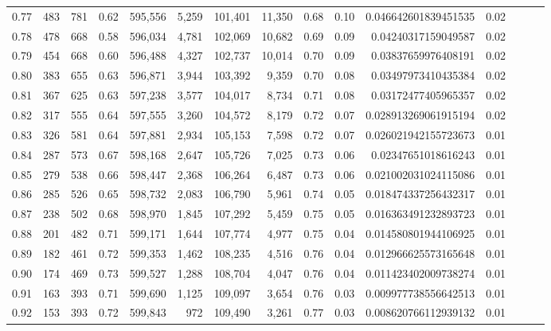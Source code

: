 \begin{tabular}{rrrrrrrrrrrrrrr}
0.77 &     483 &    781 &  0.62 &  595,556 &    5,259 &  101,401 &   11,350 &  0.68 &  0.10 &  0.046642601839451535 &      0.02 \\
0.78 &     478 &    668 &  0.58 &  596,034 &    4,781 &  102,069 &   10,682 &  0.69 &  0.09 &   0.04240317159049587 &      0.02 \\
0.79 &     454 &    668 &  0.60 &  596,488 &    4,327 &  102,737 &   10,014 &  0.70 &  0.09 &   0.03837659976408191 &      0.02 \\
0.80 &     383 &    655 &  0.63 &  596,871 &    3,944 &  103,392 &    9,359 &  0.70 &  0.08 &   0.03497973410435384 &      0.02 \\
0.81 &     367 &    625 &  0.63 &  597,238 &    3,577 &  104,017 &    8,734 &  0.71 &  0.08 &   0.03172477405965357 &      0.02 \\
0.82 &     317 &    555 &  0.64 &  597,555 &    3,260 &  104,572 &    8,179 &  0.72 &  0.07 &  0.028913269061915194 &      0.02 \\
0.83 &     326 &    581 &  0.64 &  597,881 &    2,934 &  105,153 &    7,598 &  0.72 &  0.07 &  0.026021942155723673 &      0.01 \\
0.84 &     287 &    573 &  0.67 &  598,168 &    2,647 &  105,726 &    7,025 &  0.73 &  0.06 &   0.02347651018616243 &      0.01 \\
0.85 &     279 &    538 &  0.66 &  598,447 &    2,368 &  106,264 &    6,487 &  0.73 &  0.06 &  0.021002031024115086 &      0.01 \\
0.86 &     285 &    526 &  0.65 &  598,732 &    2,083 &  106,790 &    5,961 &  0.74 &  0.05 &  0.018474337256432317 &      0.01 \\
0.87 &     238 &    502 &  0.68 &  598,970 &    1,845 &  107,292 &    5,459 &  0.75 &  0.05 &  0.016363491232893723 &      0.01 \\
0.88 &     201 &    482 &  0.71 &  599,171 &    1,644 &  107,774 &    4,977 &  0.75 &  0.04 &  0.014580801944106925 &      0.01 \\
0.89 &     182 &    461 &  0.72 &  599,353 &    1,462 &  108,235 &    4,516 &  0.76 &  0.04 &  0.012966625573165648 &      0.01 \\
0.90 &     174 &    469 &  0.73 &  599,527 &    1,288 &  108,704 &    4,047 &  0.76 &  0.04 &  0.011423402009738274 &      0.01 \\
0.91 &     163 &    393 &  0.71 &  599,690 &    1,125 &  109,097 &    3,654 &  0.76 &  0.03 &  0.009977738556642513 &      0.01 \\
0.92 &     153 &    393 &  0.72 &  599,843 &      972 &  109,490 &    3,261 &  0.77 &  0.03 &  0.008620766112939132 &      0.01 \\

\end{tabular}
